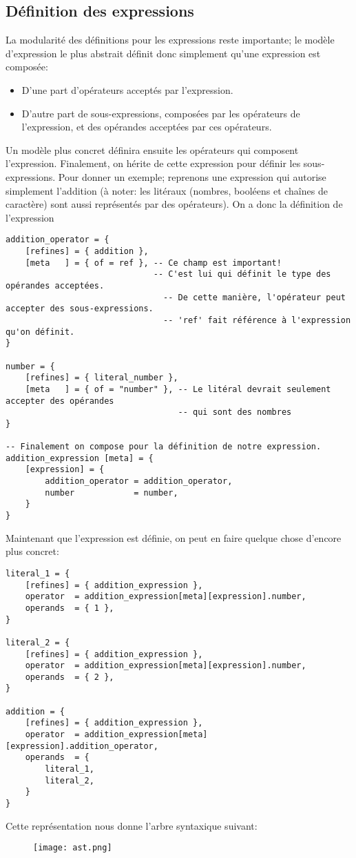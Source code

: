 \documentclass{article}
\begin{document}
\subsection{Définition des expressions}
La modularité des définitions pour les expressions reste importante; le modèle d'expression le plus abstrait définit donc simplement qu'une expression est composée:
\begin{itemize}
	\item D'une part d'opérateurs acceptés par l'expression.
	\item D'autre part de sous-expressions, composées par les opérateurs de l'expression, et des opérandes acceptées par ces opérateurs.
\end{itemize}
Un modèle plus concret définira ensuite les opérateurs qui composent l'expression. Finalement, on hérite de cette expression pour définir les sous-expressions. Pour donner un exemple; reprenons une expression qui autorise simplement l'addition (à noter: les litéraux (nombres, booléens et chaînes de caractère) sont aussi représentés par des opérateurs). On a donc la définition de l'expression
\begin{verbatim}
addition_operator = {
	[refines] = { addition },
	[meta   ] = { of = ref }, -- Ce champ est important!
	                          -- C'est lui qui définit le type des opérandes acceptées.
		                        -- De cette manière, l'opérateur peut accepter des sous-expressions.
		                        -- 'ref' fait référence à l'expression qu'on définit.
}

number = {
	[refines] = { literal_number },
	[meta   ] = { of = "number" }, -- Le litéral devrait seulement accepter des opérandes
	                               -- qui sont des nombres
}

-- Finalement on compose pour la définition de notre expression.
addition_expression [meta] = {
	[expression] = {
		addition_operator = addition_operator,
		number            = number,
	}
}
\end{verbatim}

\noindent Maintenant que l'expression est définie, on peut en faire quelque chose d'encore plus concret:
\begin{verbatim}
literal_1 = {
	[refines] = { addition_expression },
	operator  = addition_expression[meta][expression].number,
	operands  = { 1 },
}

literal_2 = {
	[refines] = { addition_expression },
	operator  = addition_expression[meta][expression].number,
	operands  = { 2 },
}

addition = {
	[refines] = { addition_expression },
	operator  = addition_expression[meta][expression].addition_operator,
	operands  = {
		literal_1,
		literal_2,
	}
}
\end{verbatim}
\noindent Cette représentation nous donne l'arbre syntaxique suivant:
\begin{center}
	\begin{figure}[h]
		\texttt{[image: ast.png]}
	\end{figure}
\end{center}
\end{document}
